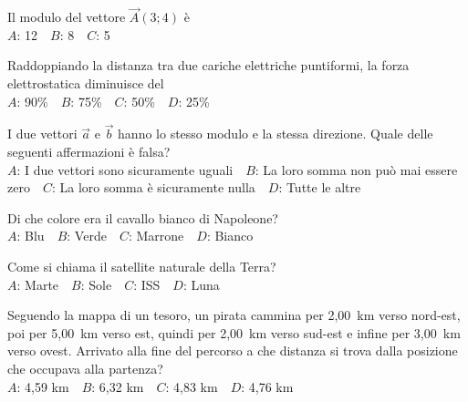 \mcquestionfooter



\def\mcquestionnumber{10}


\mcquestionheader Il modulo del vettore $\vec{A}(3;4)$ è\\
{$A$}: 12\ \ {$B$}: 8\ \ {$C$}: 5\ \ 

\mcquestionfooter



\def\mcquestionnumber{11}


\mcquestionheader Raddoppiando la distanza tra due cariche elettriche puntiformi, la forza elettrostatica diminuisce del\\
{$A$}: 90\%\ \ {$B$}: 75\%\ \ {$C$}: 50\%\ \ {$D$}: 25\%\ \ 

\mcquestionfooter



\def\mcquestionnumber{12}


\mcquestionheader I due vettori $\vec{a}$ e $\vec{b}$ hanno lo stesso modulo e la stessa direzione. Quale delle seguenti affermazioni è falsa?\\
{$A$}: I due vettori sono sicuramente uguali\ \ {$B$}: La loro somma non può mai essere zero\ \ {$C$}: La loro somma è sicuramente nulla\ \ {$D$}: Tutte le altre\ \ 

\mcquestionfooter



\mcpaperfooter

\def\mcserialnumber{16}
\mcpaperheader


\def\mcquestionnumber{1}


\mcquestionheader Di che colore era il cavallo bianco di Napoleone?\\
{$A$}: Blu\ \ {$B$}: Verde\ \ {$C$}: Marrone\ \ {$D$}: Bianco\ \ 

\mcquestionfooter



\def\mcquestionnumber{2}


\mcquestionheader Come si chiama il satellite naturale della Terra?\\
{$A$}: Marte\ \ {$B$}: Sole\ \ {$C$}: ISS\ \ {$D$}: Luna\ \ 

\mcquestionfooter



\def\mcquestionnumber{3}


\mcquestionheader Seguendo la mappa di un tesoro, un pirata cammina per 2,00~km verso nord-est, poi per 5,00~km verso est, quindi per 2,00~km verso sud-est e infine per 3,00~km verso ovest. Arrivato alla fine del percorso a che distanza si trova dalla posizione che occupava alla partenza?\\
{$A$}: 4,59 km\ \ {$B$}: 6,32 km\ \ {$C$}: 4,83 km\ \ {$D$}: 4,76 km\ \ 


